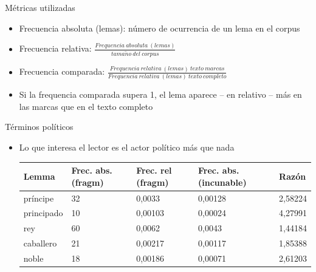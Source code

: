 \documentclass[11pt,aspectratio=169]{beamer}
\begin{document}
\begin{frame}{Métricas utilizadas}
\begin{center}
\begin{itemize}
\item Frecuencia absoluta (lemas): número de ocurrencia de un lema en el corpus
\item Frecuencia relativa: $\frac{Frequencia\ absoluta\ (lemas)}{tama\tilde{n}o\ del\ corpus}$
\item Frecuencia comparada: $\frac{Frequencia\ relativa\ (lemas)\ texto\ marcas}{Frequencia\ relativa\ (lemas)\ texto\ completo}$
\item Si la frequencia comparada supera 1, el lema aparece -- en relativo -- más en las marcas que en el texto completo
\end{itemize}
\end{center}
\end{frame}

\begin{frame}{Términos políticos}
\begin{center}

\begin{itemize}
\item Lo que interesa el lector es el actor político más que nada
\begin{table}[!ht]
    \centering
    \begin{tabular}{|l|l|l|l|l|}
    \hline
        \textbf{Lemma} & \textbf{Frec. abs. (fragm)} & \textbf{Frec. rel (fragm)} & \textbf{Frec. abs. (incunable)} & \textbf{Razón} \\ \hline
        príncipe & 32 & 0,0033 & 0,00128 & 2,58224 \\ \hline
        principado & 10 & 0,00103 & 0,00024 & 4,27991 \\ \hline
        rey & 60 & 0,0062 & 0,0043 & 1,44184 \\ \hline
        caballero & 21 & 0,00217 & 0,00117 & 1,85388 \\ \hline
        noble & 18 & 0,00186 & 0,00071 & 2,61203 \\ \hline
    \end{tabular}
\end{table}
\end{itemize}
\end{center}
\end{frame}
\end{document}
